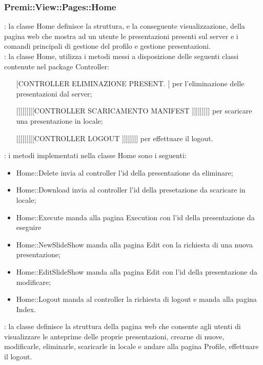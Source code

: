 {		\subsubsection{Premi::View::Pages::Home}{
			\textbf{\tipo}: la classe Home definisce la struttura, e la conseguente visualizzazione, della pagina web che mostra ad un utente le presentazioni presenti sul server e i comandi principali di gestione del profilo e gestione presentazioni.\\	
			\textbf{\relaz}: la classe Home, utilizza i metodi messi a disposizione delle seguenti classi contenute nel package Controller: 
			\begin{itemize}
				\item [[CONTROLLER ELIMINAZIONE PRESENT.]] per l'eliminazione delle presentazioni dal server;
				\item [[[[[[[[[[CONTROLLER SCARICAMENTO MANIFEST]]]]]]]]]] per scaricare una presentazione in locale;
				\item [[[[[[[[[[CONTROLLER LOGOUT]]]]]]]]] per effettuare il logout.
			\end{itemize} 
			\textbf{\interfacce}: i metodi implementati nella classe Home sono i seguenti:
			\begin{itemize}
				\item Home::Delete invia al controller l'id della presentazione da eliminare;
				\item Home::Download invia al controller l'id della presetazione da scaricare in locale;
				\item Home::Execute manda alla pagina Execution con l'id della presentazione da eseguire
				\item Home::NewSlideShow manda alla pagina Edit con la richiesta di una nuova presentazione;
				\item Home::EditSlideShow manda alla pagina Edit con l'id della presentazione da modificare;
				\item Home::Logout manda al controller la richiesta di logout e manda alla pagina Index.				
			\end{itemize} 
			\textbf{\attivita}: la classe definisce la struttura della pagina web che consente agli utenti di visualizzare le anteprime delle proprie presentazioni, crearne di nuove, modificarle, eliminarle, scaricarle in locale e andare alla pagina Profile, effettuare il logout.\\
		}
}
